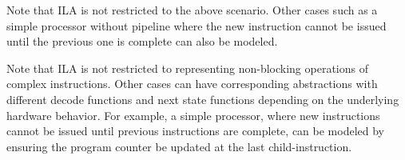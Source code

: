 Note that ILA is not restricted to the above scenario. 
Other cases such as a simple processor without pipeline where the new instruction
cannot be issued until the previous one is complete can also be modeled.
\fi

Note that ILA is not restricted to representing non-blocking operations of 
complex instructions. 
Other cases can have corresponding abstractions with different decode 
functions and next state functions depending on the underlying hardware behavior.
For example, a simple processor, where new instructions cannot be issued until
previous instructions are complete, can be modeled by ensuring the program
counter be updated at the last child-instruction.
